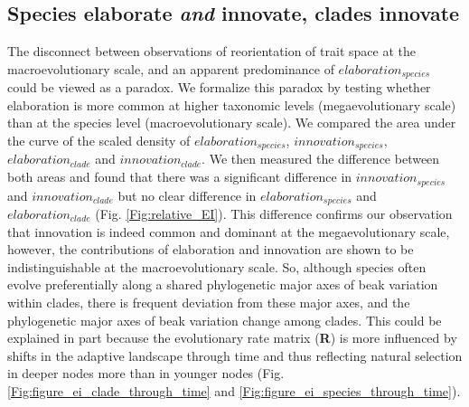 \documentclass[12pt,letterpaper]{article}
\begin{document}
\subsection{Species elaborate \textit{and} innovate, clades innovate} %
The disconnect between observations of reorientation of trait space at the macroevolutionary scale, and an apparent predominance of $elaboration_{species}$ could be viewed as a paradox.
We formalize this paradox by testing whether elaboration is more common at higher taxonomic levels (megaevolutionary scale) than at the species level (macroevolutionary scale).
We compared the area under the curve of the scaled density of $elaboration_{species}$, $innovation_{species}$, $elaboration_{clade}$ and $innovation_{clade}$.
We then measured the difference between both areas and found that there was a significant difference in $innovation_{species}$ and $innovation_{clade}$ but no clear difference in $elaboration_{species}$ and $elaboration_{clade}$ (Fig. \ref{Fig:relative_EI}).
This difference confirms our observation that innovation is indeed common and dominant at the megaevolutionary scale, however, the contributions of elaboration and innovation are shown to be indistinguishable at the macroevolutionary scale.
So, although species often evolve preferentially along a shared phylogenetic major axes of beak variation within clades, there is frequent deviation from these major axes, and the phylogenetic major axes of beak variation change among clades.
This could be explained in part because the evolutionary rate matrix (\textbf{R}) is more influenced by shifts in the adaptive landscape through time and thus reflecting natural selection in deeper nodes more than in younger nodes (Fig. \ref{Fig:figure_ei_clade_through_time} and \ref{Fig:figure_ei_species_through_time}). %
\end{document}
